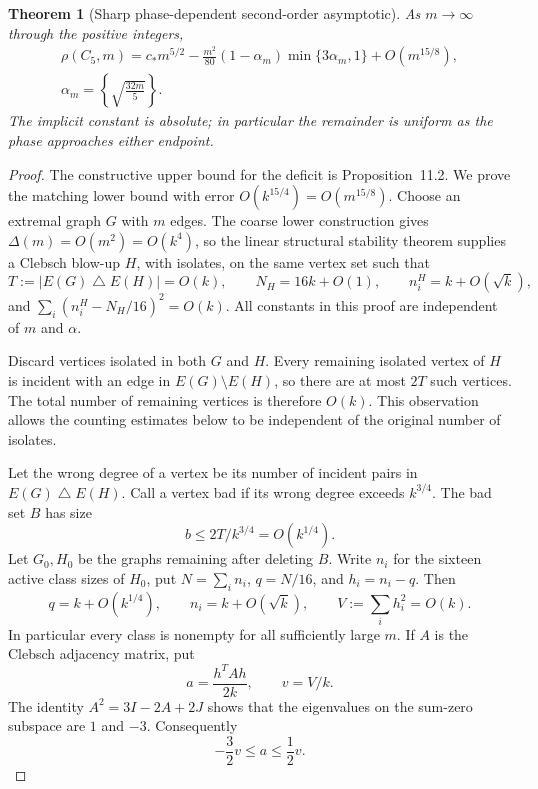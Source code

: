 \documentclass[11pt]{amsart}
\newtheorem{theorem}{Theorem}[section]
\theoremstyle{definition}
\theoremstyle{remark}
\begin{document}
\begin{theorem}[Sharp phase-dependent second-order asymptotic]
\label{thm:phase-law}
As $m\to\infty$ through the positive integers,
\begin{equation}\tag{59}\label{eq:phase-law}
 \begin{gathered}
 \rho(C_5,m)=c_\ast m^{5/2}
   -\frac{m^2}{80}(1-\alpha_m)\min\{3\alpha_m,1\}+O(m^{15/8}),\\
 \alpha_m=\left\{\sqrt{\frac{32m}{5}}\right\}.
 \end{gathered}
\end{equation}
The implicit constant is absolute; in particular the remainder is uniform
as the phase approaches either endpoint.
\end{theorem}
\begin{proof}
The constructive upper bound for the deficit is Proposition~11.2. We
prove the matching lower bound with error $O(k^{15/4})=O(m^{15/8})$.
Choose an extremal graph $G$ with $m$ edges. The coarse lower construction
gives $\Delta(m)=O(m^2)=O(k^4)$, so the linear structural stability
theorem supplies a Clebsch blow-up $H$, with isolates, on the same vertex
set such that
\begin{equation}\tag{60}\label{eq:phase-structure}
 T:=|E(G)\mathbin\triangle E(H)|=O(k),\qquad
 N_H=16k+O(1),\qquad n_i^H=k+O(\sqrt{k}),
\end{equation}
and $\sum_i(n_i^H-N_H/16)^2=O(k)$. All constants in this proof are
independent of $m$ and $\alpha$.

Discard vertices isolated in both $G$ and $H$. Every remaining isolated
vertex of $H$ is incident with an edge in $E(G)\setminus E(H)$, so there
are at most $2T$ such vertices. The total number of remaining vertices is
therefore $O(k)$. This observation allows the counting estimates below to
be independent of the original number of isolates.

Let the wrong degree of a vertex be its number of incident pairs in
$E(G)\mathbin\triangle E(H)$. Call a vertex bad if its wrong degree
exceeds $k^{3/4}$. The bad set $B$ has size
\[
 b\leq2T/k^{3/4}=O(k^{1/4}).
\]
Let $G_0,H_0$ be the graphs remaining after deleting $B$. Write $n_i$ for
the sixteen active class sizes of $H_0$, put $N=\sum_i n_i$, $q=N/16$, and
$h_i=n_i-q$. Then
\begin{equation}\tag{61}\label{eq:phase-masses}
 q=k+O(k^{1/4}),\qquad n_i=k+O(\sqrt{k}),\qquad
 V:=\sum_i h_i^2=O(k).
\end{equation}
In particular every class is nonempty for all sufficiently large $m$. If
$A$ is the Clebsch adjacency matrix, put
\[
 a=\frac{h^TAh}{2k},\qquad v=V/k.
\]
The identity $A^2=3I-2A+2J$ shows that the eigenvalues on the sum-zero
subspace are $1$ and $-3$. Consequently
\begin{equation}\tag{62}\label{eq:phase-spectrum}
 -\frac32v\leq a\leq\frac12v.
\end{equation}


\end{proof}
\end{document}

